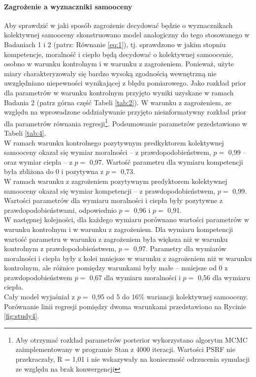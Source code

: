 \documentclass[man]{apa6}
\begin{document}
\paragraph{Zagrożenie a wyznaczniki samooceny}
Aby sprawdzić w jaki sposób zagrożenie decydować będzie o wyznacznikach kolektywnej samooceny skonstruowano model analogiczny do tego stosowanego w Badaniach 1 i 2 (patrz: Równanie \ref{eq:1}), tj. sprawdzono w jakim stopniu kompetencje, moralność i ciepło będą decydować o kolektywnej samoocenie, osobno w warunku kontrolnym i w warunku z zagrożeniem. Ponieważ, użyte miary charakteryzowały się bardzo wysoką zgodnością wewnętrzną nie uwzględniano niepewności wynikającej z błędu pomiarowego. Jako rozkład prior dla parametrów w warunku kontrolnym przyjęto wyniki uzyskane w ramach Badania 2 (patrz górna część Tabeli \ref{tab:2}). W warunku z zagrożeniem, ze względu na wprowadzone oddziaływanie przyjęto nieinformatywny rozkład prior dla parametrów równania regresji\footnote{Aby otrzymać rozkład parametrów posterior wykorzystano algorytm MCMC zaimplementowany w programie Stan z 4000 iteracji. Wartości PSRF nie przekraczały, R = 1,01 i nie wskazywały na konieczność odrzucenia symulacji ze względu na brak konwergencji}. Podsumowanie parametrów przedstawiono w Tabeli \ref{tab:4}. \\
W ramach warunku kontrolnego pozytywnym predkyktorem kolektywnej samooceny okazał się wymiar moralności -- z prawdopodobieństwem, $p =$ 0,99 -- oraz wymiar ciepła -- z $p =$ 0,97. Wartość parametru dla wymiaru kompetencji była zbliżona do 0 i pozytywna z $p =$ 0,73. \\
W ramach warunku z zagrożeniem pozytywnym predyktorem kolektywnej samooceny okazał się wymiar kompetencji -- z prawdopodobieństwem, $p =$ 0,99. Wartości parametrów dla wymiaru moralności i ciepła były pozytywne z prawdopodobieństwami, odpowiednio $p =$ 0,96 i $p =$ 0,91.\\
W następnej kolejności, dla każdego wymiaru porównano wartości parametrów w warunku kontrolnym i w warunku z zagrożeniem. Dla wymiaru kompetencji wartość parametru w warunku z zagrożeniem była większa niż w warunku kontrolnym z prawdopodobieństwem, $p =$ 0,97. Parametry dla wymiarów moralności i ciepła były z kolei mniejsze w warunku z zagrożeniem niż w warunku kontrolnym, ale różnice pomiędzy warunkami były małe -- mniejsze od 0 z prawdopodobieństwem $p = $ 0,67 dla wymiaru moralności i $p =$ 0,56 dla wymiaru ciepła.\\
Cały model wyjaśniał z $p =$ 0,95 od 5 do 16\% wariancji kolektywnej samooceny. Porównanie linii regresji pomiędzy dwoma warunkami przedstawiono na Rycinie \ref{fig:study4}.\\
\end{document}
